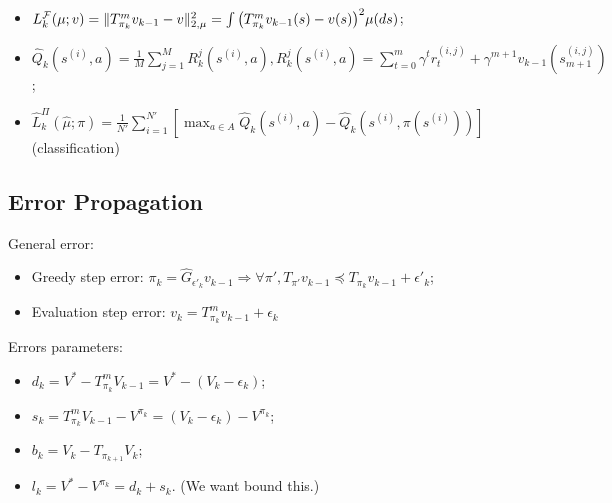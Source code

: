 \documentclass[a4paper]{article}
\begin{document}
\begin{enumerate}
\begin{itemize}
            \item $ L^{\mathcal{F}}_{k}(\mu; v) = \Arrowvert T^m_{\pi_k} v_{k-1} - v \Arrowvert^2_{2,\mu} = \int {\left( T^m_{\pi_k}v_{k-1}(s) - v(s) \right)}^2 \mu(ds) $;
            \item $ \hat Q_k(s^{(i)}, a) = \frac{1}{M} \sum^{M}_{j=1} R^{j}_{k}(s^{(i)}, a), R^j_k(s^{(i)},a) = \sum^{m}_{t=0} \gamma^t r^{(i,j)}_t + \gamma^{m+1}v_{k-1}(s^{(i,j)}_{m+1}) $;
            \item $ \hat L^{\Pi}_k(\hat \mu; \pi) = \frac{1}{N'} \sum^{N'}_{i=1} \left[ \max_{a \in A} \hat Q_k(s^{(i)}, a) - \hat Q_k(s^{(i)}, \pi(s^{(i)})) \right] $ (classification)
        \end{itemize}
\end{enumerate}

\subsection{Error Propagation}%
General error:
\begin{itemize}
    \item Greedy step error: $ \pi_k = \hat G_{\epsilon'_k} v_{k-1} \Rightarrow \forall \pi', T_{\pi'} v_{k-1} \preceq T_{\pi_k} v_{k-1} + \epsilon'_k $;
    \item Evaluation step error: $ v_k = T^m_{\pi_k} v_{k-1} + \epsilon_k $
\end{itemize}

Errors parameters:
\begin{itemize}
    \item $ d_k = V^* - T^m_{\pi_k} V_{k-1} = V^* - (V_k - \epsilon_k) $;
    \item $ s_k = T^m_{\pi_k}V_{k-1} - V^{\pi_k} = (V_k - \epsilon_k) - V^{\pi_k} $;
    \item $ b_k = V_k - T_{\pi_{k+1}}V_k $;
    \item $ l_k = V^* - V^{\pi_k} = d_k + s_k $. (We want bound this.)
\end{itemize}
\end{document}
